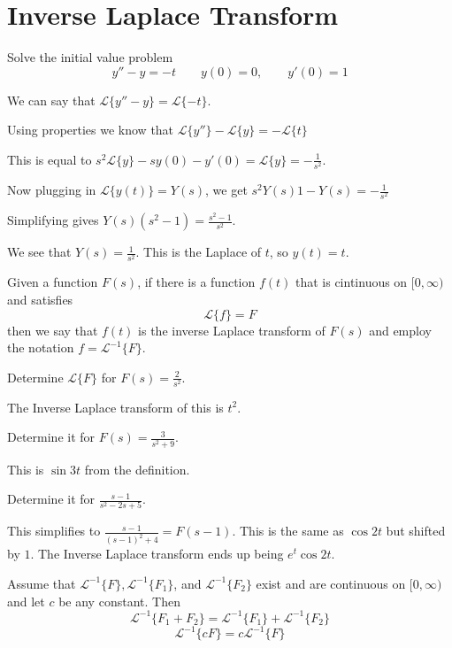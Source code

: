 \documentclass[../diffeq.tex]{subfiles}
\begin{document}
\section{Inverse Laplace Transform}
\begin{example}
    Solve the initial value problem 
    \[ y''-y=-t \qquad y(0)=0, \qquad y'(0)=1 \]

    We can say that $\mathcal{L}\{y''-y\}=\mathcal{L}\{-t\}$.

    Using properties we know that $\mathcal{L}\{y''\}-\mathcal{L}\{y\}=-\mathcal{L}\{t\}$

    This is equal to $s^2\mathcal{L}\{y\}-sy(0)-y'(0)=\mathcal{L}\{y\}=-\frac{1}{s^2}$.

    Now plugging in $\mathcal{L}\{y(t)\}=Y(s)$, we get $s^2Y(s)1-Y(s)=-\frac{1}{s^2}$

    Simplifying gives $Y(s)(s^2-1)=\frac{s^2-1}{s^2}$.

    We see that $Y(s)=\frac{1}{s^2}$. This is the Laplace of $t$, so $y(t)=t$.
\end{example}

\begin{definition}
    Given a function $F(s)$, if there is a function $f(t)$ that is cintinuous on $[0,\infty)$ and satisfies 
    \[ \mathcal{L}\{f\}=F \]
    then we say that $f(t)$ is the inverse Laplace transform of $F(s)$ and employ the notation $f=\mathcal{L}^{-1}\{F\}$.
\end{definition}

\begin{example}
    Determine $\mathcal{L}\{F\}$ for $F(s)=\frac{2}{s^2}$.

    The Inverse Laplace transform of this is $t^2$.

    Determine it for $F(s)=\frac{3}{s^2+9}$.

    This is $\sin 3t$ from the definition.

    Determine it for $\frac{s-1}{s^2-2s+5}$.

    This simplifies to $\frac{s-1}{(s-1)^2+4}=F(s-1)$. This is the same as $\cos 2t$ but shifted by $1$. The Inverse Laplace transform ends up being $e^t \cos 2t$.
\end{example}

\pagebreak
\begin{theorem}
    Assume that $\mathcal{L}^{-1}\{F\}, \mathcal{L}^{-1}\{F_1\}$, and $\mathcal{L}^{-1}\{F_2\}$ exist and are continuous on $[0,\infty)$ and let $c$ be any constant. Then 
    \[ \mathcal{L}^{-1}\{F_1+F_2\} = \mathcal{L}^{-1}\{F_1\}+\mathcal{L}^{-1}\{F_2\} \]
    \[ \mathcal{L}^{-1}\{cF\} = c\mathcal{L}^{-1}\{F\} \]
\end{theorem}
\end{document}
